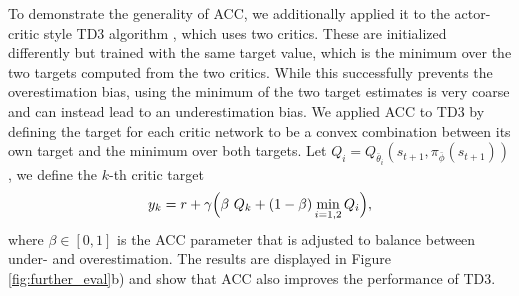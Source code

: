 To demonstrate the generality of ACC, we additionally applied it to the actor-critic style TD3 algorithm \cite{td3},
which uses two critics. These are initialized differently but trained with the same target value, which is the minimum over the two targets computed from the two critics.
While this successfully prevents the overestimation bias, using the minimum of the two target estimates is very coarse and can instead lead to an underestimation bias.
We applied ACC to TD3 by defining the target for each critic network to be a convex combination between its own target and the minimum over both targets.
Let $Q_i = Q_{\bar{\theta}_i} (s_{t+1}, \pi_{\bar{\phi}} (s_{t+1}) )$, we define the $k$-th critic target
\vspace{-.1cm}
\begin{equation}
\label{eq:td3_target_acc}
    y_k = r + \gamma 
    \Big(   \beta ~ Q_k \nonumber 
     + (1-\beta) \min_{i=1,2} Q_i
    \Big),
\vspace{-.1cm}
\end{equation}
where $\beta \in [0,1]$ is the ACC parameter that is adjusted to balance between under- and overestimation.
The results are displayed in Figure 
\ref{fig:further_eval}b)
and show that ACC also improves the performance of TD3.












